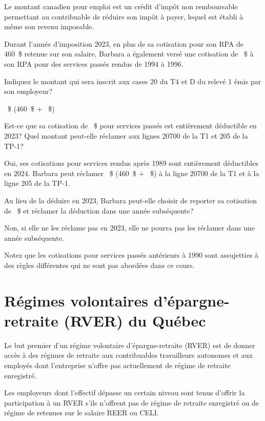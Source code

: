 Le montant canadien pour emploi est un crédit d'impôt non remboursable permettant au contribuable de réduire son impôt à payer, lequel est établi à même son revenu imposable.

\begin{question}
	Durant l'année d'imposition 2023, en plus de sa cotisation pour son RPA de 460~\$ retenue sur son salaire, Barbara a également versé une cotisation de ~\$ à son RPA pour des services passés rendus de 1994 à 1996.
\end{question}
\setcounter{sousQuestion}{0}
\begin{sousQuestion}
	Indiquez le montant qui sera inscrit aux cases 20 du T4 et D du relevé 1 émis par son employeur?
\end{sousQuestion}
~\$ (460~\$ + ~\$)
\begin{sousQuestion}
	Est-ce que sa cotisation de ~\$ pour services passés est entièrement déductible en 2023?  Quel montant peut-elle réclamer aux lignes 20700 de la T1 et 205 de la TP-1?
\end{sousQuestion}
Oui, ses cotisations pour services rendus après 1989 sont entièrement déductibles en 2024. Barbara peut réclamer ~\$ (460~\$ + ~\$) à la ligne 20700 de la T1 et à la ligne 205 de la TP-1.
\begin{sousQuestion}
	Au lieu de la déduire en 2023, Barbara peut-elle choisir de reporter sa cotisation de ~\$ et réclamer la déduction dans une année subséquente?
\end{sousQuestion}
Non, si elle ne les réclame pas en 2023, elle ne pourra pas les réclamer dans une année subséquente.

Notez que les cotisations pour services passés antérieurs à 1990 sont assujetties à des règles différentes qui ne sont pas abordées dans ce cours.



\section{Régimes volontaires d'épargne-retraite (RVER) du Québec}
\begin{intro}
	Le but premier d'un régime volontaire d'épargne-retraite (RVER) est de donner accès à des régimes de retraite aux contribuables travailleurs autonomes et aux employés dont l'entreprise n'offre pas actuellement de régime de retraite enregistré.
\end{intro}
Les employeurs dont l'effectif dépasse un certain niveau sont tenus d'offrir la participation à un RVER s'ils n'offrent pas de régime de retraite enregistré ou de régime de retenues sur le salaire REER ou CELI.

